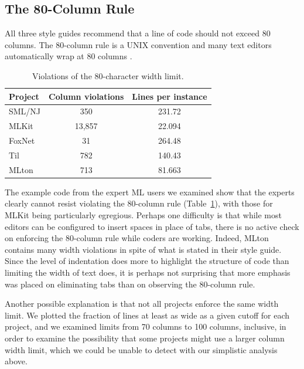 \documentclass[12pt,abstracton]{scrartcl}
\begin{document}
\subsection{The 80-Column Rule}\label{subsec:80}
All three style guides recommend that a line of code should not exceed 80 columns.
The 80-column rule is a UNIX convention and many text editors automatically
wrap at 80 columns \cite{Cmu12}.

\begin{table}[t!]
\centering
\begin{tabular}{|l||c|c|}
\hline
Project & Column violations & Lines per instance \\ \hline\hline
SML/NJ & 350 & 231.72 \\
MLKit & 13,857 & 22.094 \\
FoxNet & 31 & 264.48 \\
Til & 782 & 140.43 \\
MLton & 713 & 81.663 \\ \hline
\end{tabular}
\caption{Violations of the 80-character width limit.}
\label{table:width}
\end{table}

The example code from the expert ML users we examined show that the experts clearly cannot
resist violating the 80-column rule (Table~\ref{table:width}), with
those for MLKit being particularly egregious. Perhaps one difficulty is that while most editors can be configured to insert
spaces in place of tabs, there is no active check on enforcing the 80-column
rule while coders are working.
Indeed, MLton contains many width violations in spite of what is stated in their style guide.
Since the level of indentation does more to highlight the structure of code than
limiting the width of text does, it is perhaps not surprising that more
emphasis was placed on eliminating tabs than on observing the 80-column rule.

Another possible explanation is that not all projects enforce the same width limit.
We plotted the fraction of lines at least as wide as a given cutoff for each project,
and we examined limits from 70 columns to 100 columns, inclusive, in order to
examine the possibility that some projects might use a larger column width limit,
which we could be unable to detect with our simplistic analysis above.
\end{document}
